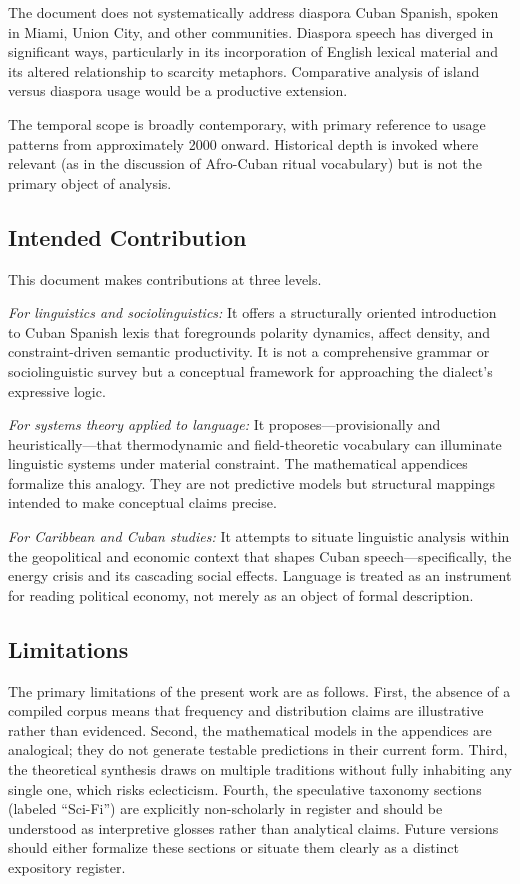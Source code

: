 \documentclass[12pt]{article}
\begin{document}
The document does not systematically address diaspora Cuban Spanish, spoken in Miami, Union City, and other communities. Diaspora speech has diverged in significant ways, particularly in its incorporation of English lexical material and its altered relationship to scarcity metaphors. Comparative analysis of island versus diaspora usage would be a productive extension.

The temporal scope is broadly contemporary, with primary reference to usage patterns from approximately 2000 onward. Historical depth is invoked where relevant (as in the discussion of Afro-Cuban ritual vocabulary) but is not the primary object of analysis.

\subsection*{Intended Contribution}

This document makes contributions at three levels.

\textit{For linguistics and sociolinguistics:} It offers a structurally oriented introduction to Cuban Spanish lexis that foregrounds polarity dynamics, affect density, and constraint-driven semantic productivity. It is not a comprehensive grammar or sociolinguistic survey but a conceptual framework for approaching the dialect's expressive logic.

\textit{For systems theory applied to language:} It proposes---provisionally and heuristically---that thermodynamic and field-theoretic vocabulary can illuminate linguistic systems under material constraint. The mathematical appendices formalize this analogy. They are not predictive models but structural mappings intended to make conceptual claims precise.

\textit{For Caribbean and Cuban studies:} It attempts to situate linguistic analysis within the geopolitical and economic context that shapes Cuban speech---specifically, the energy crisis and its cascading social effects. Language is treated as an instrument for reading political economy, not merely as an object of formal description.

\subsection*{Limitations}

The primary limitations of the present work are as follows. First, the absence of a compiled corpus means that frequency and distribution claims are illustrative rather than evidenced. Second, the mathematical models in the appendices are analogical; they do not generate testable predictions in their current form. Third, the theoretical synthesis draws on multiple traditions without fully inhabiting any single one, which risks eclecticism. Fourth, the speculative taxonomy sections (labeled ``Sci-Fi'') are explicitly non-scholarly in register and should be understood as interpretive glosses rather than analytical claims. Future versions should either formalize these sections or situate them clearly as a distinct expository register.
\end{document}

